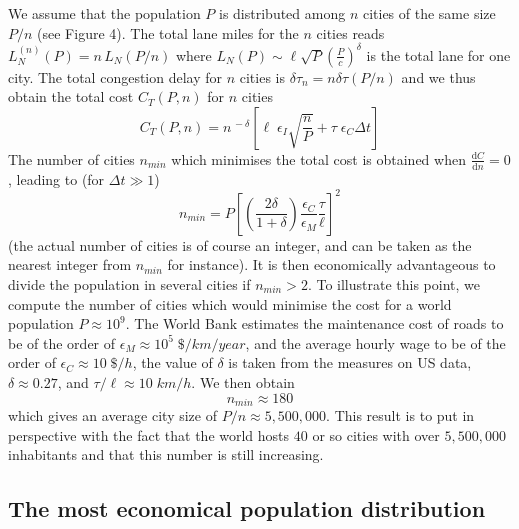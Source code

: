 We assume that the population $P$ is distributed among $n$ cities of the same size $P/n$ (see Figure 4). The total lane miles for the $n$ cities reads $L^{(n)}_N(P)=n\,L_N(P/n)$ where $L_N(P)\sim\ell \sqrt{P}\left(\frac{P}{c}\right)^\delta$ is the total lane for one city.  The total congestion delay for $n$ cities is $\delta \tau_n = n\delta\tau(P/n)$ and we thus obtain the total cost $C_T(P,n)$ for $n$ cities
%
\begin{equation}
C_T(P,n) = n^{\, -\delta} \left[ \ell\; \epsilon_I \sqrt{\frac{n}{P}} + \tau\;\epsilon_C \Delta t \right] 
\end{equation}
%
The number of cities $n_{min}$ which minimises the total cost is obtained when $\frac{\mathrm{d} C}{\mathrm{d} n} = 0$, leading to (for $\Delta t\gg 1$)
%
\begin{equation}
n_{min} = P \left[ \left( \frac{2\delta}{1+\delta} \right) \frac{\epsilon_C}{\epsilon_M} \frac{\tau}{\ell} \right]^2
\end{equation}
%
(the actual number of cities is of course an integer, and can be taken as the nearest integer from $n_{min}$ for instance).  It is then economically advantageous to divide the population in several cities if $n_{min} > 2$. To illustrate this point, we compute the number of cities which would minimise the cost for a world population $P \approx 10^9$. The World Bank estimates the maintenance cost of roads to be of the order of $\epsilon_M \approx 10^5\; \$/km/year$, and the average hourly wage to be of the order of $\epsilon_C \approx 10\; \$/h$, the value of $\delta$ is taken from the measures on US data, $\delta \approx 0.27$, and $\tau / \ell \approx 10\; km/h$. We then obtain
%
\begin{equation}
n_{min} \approx 180
\end{equation}
%
which gives an average city size of $P/n\approx 5,500,000$. This result is to put in perspective with the fact that the world hosts
$40$ or so cities with over $5,500,000$ inhabitants and that this number is still increasing. 

\subsection{The most economical population distribution}

